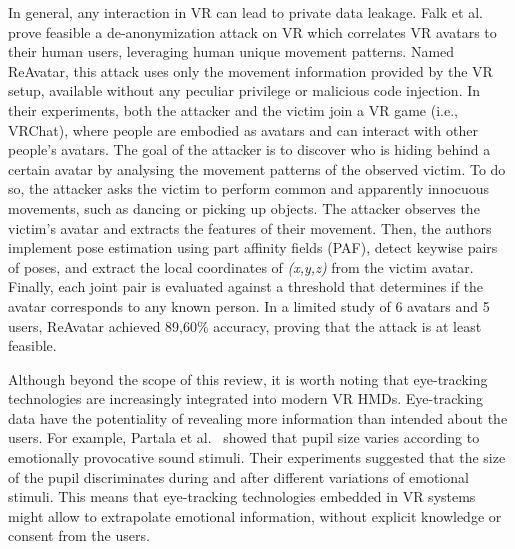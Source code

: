 \documentclass[journal]{IEEEtran}
\begin{document}
In general, any interaction in VR can lead to private data leakage. Falk et al.~\cite{falk2021} prove feasible a de-anonymization attack on VR which correlates VR avatars to their human users, leveraging human unique movement patterns. Named ReAvatar, this attack uses only the movement information provided by the VR setup, available without any peculiar privilege or malicious code injection. In their experiments, both the attacker and the victim join a VR game (i.e., VRChat), where people are embodied as avatars and can interact with other people's avatars. The goal of the attacker is to discover who is hiding behind a certain avatar by analysing the movement patterns of the observed victim. To do so, the attacker asks the victim to perform common and apparently innocuous movements, such as dancing or picking up objects. The attacker observes the victim's avatar and extracts the features of their movement. Then, the authors implement pose estimation using part affinity fields (PAF), detect keywise pairs of poses, and extract the local coordinates of \textit{(x,y,z)} from the victim avatar. Finally, each joint pair is evaluated against a threshold that determines if the avatar corresponds to any known person. In a limited study of 6 avatars and 5 users, ReAvatar achieved 89,60\% accuracy, proving that the attack is at least feasible. %


Although beyond the scope of this review, it is worth noting that eye-tracking technologies are increasingly integrated into modern VR HMDs. Eye-tracking data have the potentiality of revealing more information than intended about the users. For example, Partala et al.~\cite{partala2000} showed that pupil size varies according to emotionally provocative sound stimuli. Their experiments suggested that the size of the pupil discriminates during and after different variations of emotional stimuli. This means that eye-tracking technologies embedded in VR systems might allow to extrapolate emotional information, without explicit knowledge or consent from the users.
\end{document}
